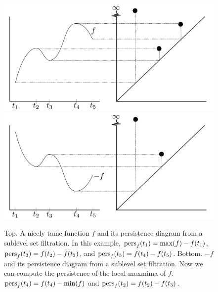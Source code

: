 \begin{figure}[htp]
    \centering
    {\includegraphics[width=.7\textwidth]{images/nodelife}}
   {\includegraphics[width=.7\textwidth]{images/nodelife-max}}
    \caption{Top. A nicely tame function $f$ and its persistence diagram from a sublevel set filtration.
In this example, $\text{pers}_f(t_1) = \max(f)-f(t_1)$, $\text{pers}_f(t_3)=f(t_2)-f(t_3)$, and $\text{pers}_f(t_5)=f(t_4)-f(t_5)$.
Bottom. $-f$ and its persistence diagram from a sublevel set filtration. Now we can compute the persistence of the local maxmima of $f$.
$\text{pers}_f(t_4) = f(t_4)-\min(f)$ and $\text{pers}_f(t_2)=f(t_2)-f(t_3)$.}
    \label{fig:nodelife}
\end{figure}



